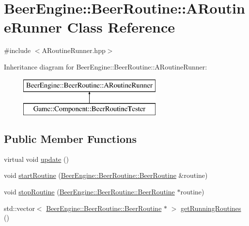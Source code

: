 \hypertarget{class_beer_engine_1_1_beer_routine_1_1_a_routine_runner}{}\section{Beer\+Engine\+:\+:Beer\+Routine\+:\+:A\+Routine\+Runner Class Reference}
\label{class_beer_engine_1_1_beer_routine_1_1_a_routine_runner}


{\ttfamily \#include $<$A\+Routine\+Runner.\+hpp$>$}

Inheritance diagram for Beer\+Engine\+:\+:Beer\+Routine\+:\+:A\+Routine\+Runner\+:\begin{figure}[H]
\begin{center}
\leavevmode
\includegraphics[height=2.000000cm]{class_beer_engine_1_1_beer_routine_1_1_a_routine_runner}
\end{center}
\end{figure}
\subsection*{Public Member Functions}
\begin{DoxyCompactItemize}
\item 
virtual void \mbox{\hyperlink{class_beer_engine_1_1_beer_routine_1_1_a_routine_runner_a7a5253cb3a64dcb1aa66806fe7c12f62}{update}} ()
\item 
void \mbox{\hyperlink{class_beer_engine_1_1_beer_routine_1_1_a_routine_runner_a39c1caf6c18c8f6e2821dc490226279f}{start\+Routine}} (\mbox{\hyperlink{class_beer_engine_1_1_beer_routine_1_1_beer_routine}{Beer\+Engine\+::\+Beer\+Routine\+::\+Beer\+Routine}} \&routine)
\item 
void \mbox{\hyperlink{class_beer_engine_1_1_beer_routine_1_1_a_routine_runner_a3c4bff92fb1bad462946a3b48e62a44e}{stop\+Routine}} (\mbox{\hyperlink{class_beer_engine_1_1_beer_routine_1_1_beer_routine}{Beer\+Engine\+::\+Beer\+Routine\+::\+Beer\+Routine}} $\ast$routine)
\item 
std\+::vector$<$ \mbox{\hyperlink{class_beer_engine_1_1_beer_routine_1_1_beer_routine}{Beer\+Engine\+::\+Beer\+Routine\+::\+Beer\+Routine}} $\ast$ $>$ \mbox{\hyperlink{class_beer_engine_1_1_beer_routine_1_1_a_routine_runner_a6f8c4cb25ea70365de58a6dfba860d96}{get\+Running\+Routines}} ()
\end{DoxyCompactItemize}
